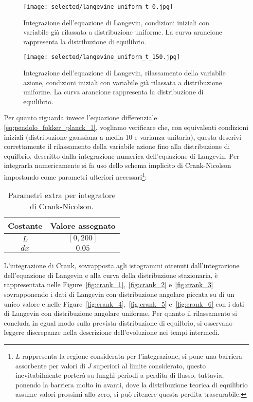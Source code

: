 \documentclass[10pt,a4paper]{article}
\begin{document}
\begin{figure}[p]
	\centering
	\texttt{[image: selected/langevine\_uniform\_t\_0.jpg]}
	\caption{Integrazione dell'equazione di Langevin, condizioni iniziali con variabile già rilassata a distribuzione uniforme. La curva arancione rappresenta la distribuzione di equilibrio.}
	\label{fig:langevin_uniform_0}
\end{figure}

\begin{figure}[p]
	\centering
	\texttt{[image: selected/langevine\_uniform\_t\_150.jpg]}
	\caption{Integrazione dell'equazione di Langevin, rilassamento della variabile azione, condizioni iniziali con variabile già rilassata a distribuzione uniforme. La curva arancione rappresenta la distribuzione di equilibrio.}
	\label{fig:langevin_uniform_150}
\end{figure}
Per quanto riguarda invece l'equazione differenziale \eqref{eq:pendolo_fokker_planck_1}, vogliamo verificare che, con equivalenti condizioni iniziali (distribuzione gaussiana a media 10 e varianza unitaria), questa descrivi correttamente il rilassamento della variabile azione fino alla distribuzione di equilbrio, descritto dalla integrazione numerica dell'equazione di Langevin. Per integrarla numericamente si fa uso dello schema implicito di Crank-Nicolson impostando come parametri ulteriori necessari\footnote{\(L\) rappresenta la regione considerata per l'integrazione, si pone una barriera assorbente per valori di \(J\) superiori al limite considerato, questo inevitabilmente porterà su lunghi periodi a perdita di flusso, tuttavia, ponendo la barriera molto in avanti, dove la distribuzione teorica di equilibrio assume valori prossimi allo zero, si può ritenere questa perdita trascurabile.}:
\begin{table}[!]
	\centering
	\begin{tabular}{cc}
	\toprule
	Costante & {Valore assegnato} \\
	\midrule
	\(L\)		& \([0,200]\)	\\
	\(dx\)		& \(0.05\)	\\
	\bottomrule
	\end{tabular}
	\caption{Parametri extra per integratore di Crank-Nicolson.}
	\label{tab:valori_2}
\end{table}
L'integrazione di Crank, sovrapposta agli istogrammi ottenuti dall'integrazione dell'equazione di Langevin e alla curva della distribuzione stazionaria, è rappresentata nelle Figure~\ref{fig:crank_1},~\ref{fig:crank_2} e~\ref{fig:crank_3} sovrapponendo i dati di Langevin con distribuzione angolare piccata su di un unico valore e nelle Figure~\ref{fig:crank_4},~\ref{fig:crank_5} e~\ref{fig:crank_6} con i dati di Langevin con distribuzione angolare uniforme. Per quanto il rilassamento si concluda in egual modo sulla prevista distribuzione di equilbrio, si osservano leggere discrepanze nella descrizione dell'evoluzione nei tempi intermedi.
\end{document}
